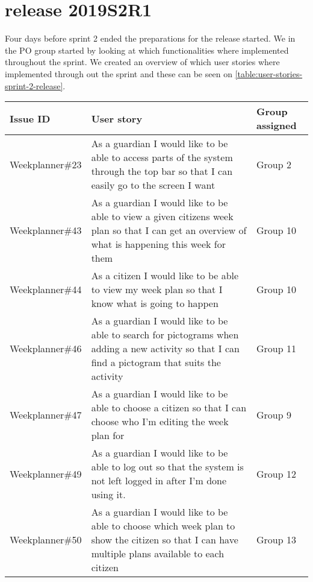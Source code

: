 \section{release 2019S2R1}
Four days before sprint 2 ended the preparations for  the release started. We in the PO group started by looking at which functionalities where implemented throughout the sprint.
We created an overview of which user stories where implemented through out the sprint and these can be seen on \autoref{table:user-stories-sprint-2-release}.

\begin{table}[H]
    \small
    \begin{tabular}{|p{2.8cm}|p{7cm}|p{2cm}|}
    \hline
    Issue ID        & User story                                                                                                                                                                               & Group assigned      \\ \hline
    Weekplanner\#23 & As a guardian I would like to be able to access parts of the system through the top bar so that I can easily go to the screen I want                                                     & Group 2             \\ \hline
    Weekplanner\#43 & As a guardian I would like to be able to view a given citizens week plan so that I can get an overview of what is happening this week for them                                           & Group 10            \\ \hline
    Weekplanner\#44 & As a citizen I would like to be able to view my week plan so that I know what is going to happen                                                                                         & Group 10            \\ \hline
    Weekplanner\#46 & As a guardian I would like to be able to search for pictograms when adding a new activity so that I can find a pictogram that suits the activity                                         & Group 11            \\ \hline
    Weekplanner\#47 & As a guardian I would like to be able to choose a citizen so that I can choose who I’m editing the week plan for                                                                         & Group 9             \\ \hline
    Weekplanner\#49 & As a guardian I would like to be able to log out so that the system is not left logged in after I’m done using it.                                                                       & Group 12            \\ \hline
    Weekplanner\#50 & As a guardian I would like to be able to choose which week plan to show the citizen so that I can have multiple plans available to each citizen                                          & Group 13            \\ \hline


\end{tabular}
\end{table}
